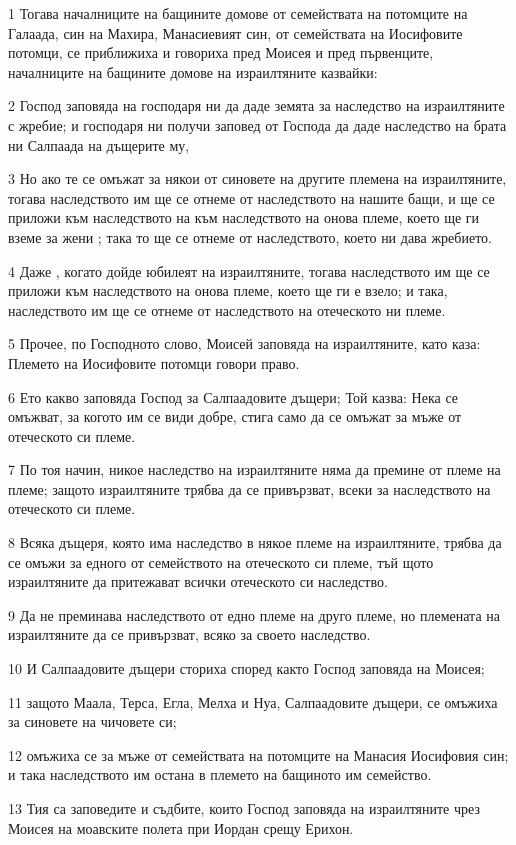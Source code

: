 \par 1 Тогава началниците на бащините домове от семействата на потомците на Галаада, син на Махира, Манасиевият син, от семействата на Иосифовите потомци, се приближиха и говориха пред Моисея и пред първенците, началниците на бащините домове на израилтяните казвайки:
\par 2 Господ заповяда на господаря ни да даде земята за наследство на израилтяните с жребие; и господаря ни получи заповед от Господа да даде наследство на брата ни Салпаада на дъщерите му,
\par 3 Но ако те се омъжат за някои от синовете на другите племена на израилтяните, тогава наследството им ще се отнеме от наследството на нашите бащи, и ще се приложи към наследството на към наследството на онова племе, което ще ги вземе за жени ; така то ще се отнеме от наследството, което ни дава жребието.
\par 4 Даже , когато дойде юбилеят на израилтяните, тогава наследството им ще се приложи към наследството на онова племе, което ще ги е взело; и така, наследството им ще се отнеме от наследството на отеческото ни племе.
\par 5 Прочее, по Господното слово, Моисей заповяда на израилтяните, като каза: Племето на Иосифовите потомци говори право.
\par 6 Ето какво заповяда Господ за Салпаадовите дъщери; Той казва: Нека се омъжват, за когото им се види добре, стига само да се омъжат за мъже от отеческото си племе.
\par 7 По тоя начин, никое наследство на израилтяните няма да премине от племе на племе; защото израилтяните трябва да се привързват, всеки за наследството на отеческото си племе.
\par 8 Всяка дъщеря, която има наследство в някое племе на израилтяните, трябва да се омъжи за едного от семейството на отеческото си племе, тъй щото израилтяните да притежават всички отеческото си наследство.
\par 9 Да не преминава наследството от едно племе на друго племе, но племената на израилтяните да се привързват, всяко за своето наследство.
\par 10 И Салпаадовите дъщери сториха според както Господ заповяда на Моисея;
\par 11 защото Маала, Терса, Егла, Мелха и Нуа, Салпаадовите дъщери, се омъжиха за синовете на чичовете си;
\par 12 омъжиха се за мъже от семействата на потомците на Манасия Иосифовия син; и така наследството им остана в племето на бащиното им семейство.
\par 13 Тия са заповедите и съдбите, които Господ заповяда на израилтяните чрез Моисея на моавските полета при Иордан срещу Ерихон.

